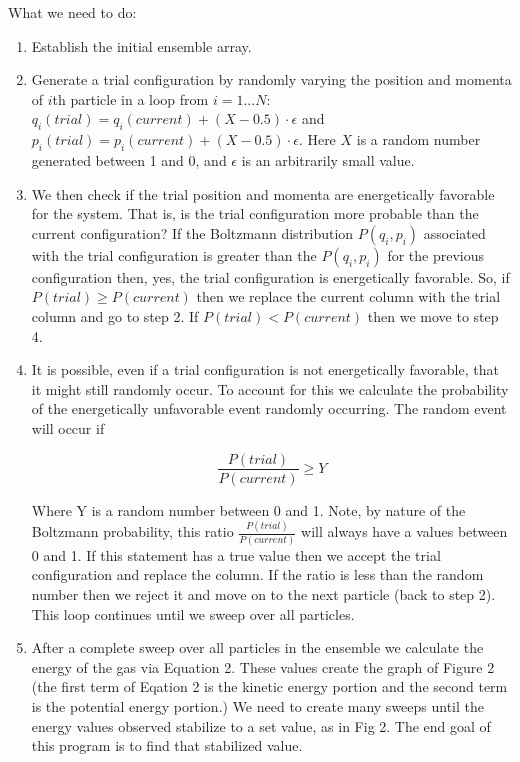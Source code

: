 \documentclass[11pt]{amsart}
\begin{document}
What we need to do:
\begin{enumerate}
\item Establish the initial ensemble array.
\item Generate a trial configuration by randomly varying the position and momenta of $i$th particle in a loop from $i=1...N$: $q_i(trial)=q_i(current)+(X-0.5) \cdot \epsilon$ and $p_i(trial)=p_i(current)+(X-0.5) \cdot \epsilon$.  Here $X$ is a random number generated between 1 and 0, and $\epsilon$ is an arbitrarily small value.

\item We then check if the trial position and momenta are energetically favorable for the system.  That is, is the trial configuration more probable than the current configuration?  If the Boltzmann distribution $P(q_i,p_i)$ associated with the trial configuration is greater than the $P(q_i,p_i)$ for the previous configuration then, yes, the trial configuration is energetically favorable.  So, if $P(trial) \geq P(current)$ then we replace the current column with the trial column and go to step 2.  If $P(trial) < P(current)$ then we move to step 4.

\item It is possible, even if a trial configuration is not energetically favorable, that it might still randomly occur.  To account for this we calculate the probability of the energetically unfavorable event randomly occurring. The random event will occur if 

 \[
 \frac {P(trial)}{P(current)} \geq Y
\]

Where Y is a random number between 0 and 1.  Note, by nature of the Boltzmann probability, this ratio $ \frac {P(trial)}{P(current)}$ will always have a values between 0 and 1.  If this statement has a true value then we accept the trial configuration and replace the column.  If the ratio is less than the random number then we reject it and move on to the next particle (back to step 2).  This loop continues until we sweep over all particles.

\item After a complete sweep over all particles in the ensemble we calculate the energy of the gas via Equation 2.  These values create the graph of Figure 2 (the first term of Eqation 2 is the kinetic energy portion and the second term is the potential energy portion.)  We need to create many sweeps until the energy values observed stabilize to a set value, as in Fig 2.  The end goal of this program is to find that stabilized value.

\end{enumerate}
\vspace{5 mm}
\end{document}
